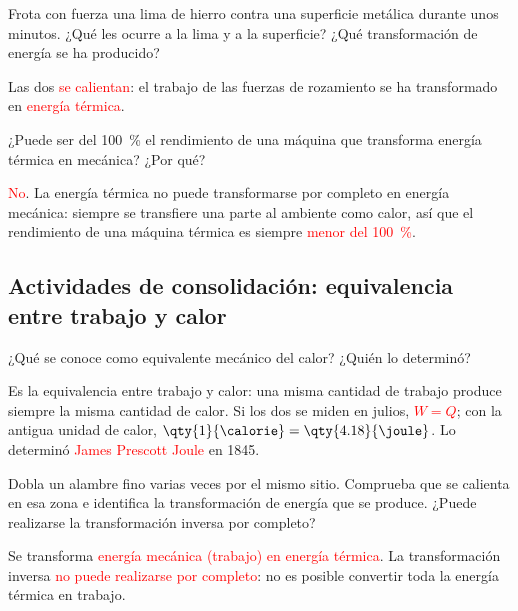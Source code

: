 \begin{exercise}
    Frota con fuerza una lima de hierro contra una superficie metálica durante unos minutos. ¿Qué les ocurre a la lima y a la superficie? ¿Qué transformación de energía se ha producido?
    \begin{solu}
        Las dos \textcolor{red}{se calientan}: el trabajo de las fuerzas de rozamiento se ha transformado en \textcolor{red}{energía térmica}.
    \end{solu}
\end{exercise}

\begin{exercise}
    ¿Puede ser del \qty{100}{\percent} el rendimiento de una máquina que transforma energía térmica en mecánica? ¿Por qué?
    \begin{solu}
        \textcolor{red}{No}. La energía térmica no puede transformarse por completo en energía mecánica: siempre se transfiere una parte al ambiente como calor, así que el rendimiento de una máquina térmica es siempre \textcolor{red}{menor del \qty{100}{\percent}}.
    \end{solu}
\end{exercise}

\subsection*{Actividades de consolidación: equivalencia entre trabajo y calor}

\begin{exercise}
    ¿Qué se conoce como equivalente mecánico del calor? ¿Quién lo determinó?
    \begin{solu}
        Es la equivalencia entre trabajo y calor: una misma cantidad de trabajo produce siempre la misma cantidad de calor. Si los dos se miden en julios, \textcolor{red}{\(W = Q\)}; con la antigua unidad de calor, \(\qty{1}{\calorie} = \qty{4.18}{\joule}\). Lo determinó \textcolor{red}{James Prescott Joule} en 1845.
    \end{solu}
\end{exercise}

\begin{exercise}
    Dobla un alambre fino varias veces por el mismo sitio. Comprueba que se calienta en esa zona e identifica la transformación de energía que se produce. ¿Puede realizarse la transformación inversa por completo?
    \begin{solu}
        Se transforma \textcolor{red}{energía mecánica (trabajo) en energía térmica}. La transformación inversa \textcolor{red}{no puede realizarse por completo}: no es posible convertir toda la energía térmica en trabajo.
    \end{solu}
\end{exercise}

